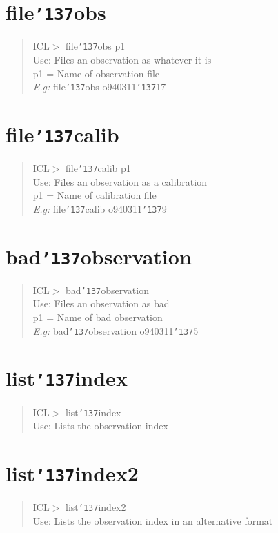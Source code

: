 \documentclass[a4paper]{book}
\renewcommand{\_}{{\tt\char'137}}
\begin{document}
\section{file\_obs}
\begin{quote}
ICL$>$ file\_obs p1 \\
Use: Files an observation as whatever it is \\
p1 = Name of observation file \\
{\em E.g:} file\_obs o940311\_17  
\end{quote}
\section{file\_calib}
\begin{quote}
ICL$>$ file\_calib p1 \\
Use: Files an observation as a calibration \\ 
p1 = Name of calibration file \\
{\em E.g:} file\_calib o940311\_9
\end{quote}
\section{bad\_observation}
\begin{quote}
ICL$>$ bad\_observation \\
Use: Files an observation as bad \\
p1 = Name of bad observation \\
{\em E.g:} bad\_observation o940311\_5
\end{quote}
\section{list\_index}
\begin{quote}
ICL$>$ list\_index \\
Use: Lists the observation index 
\end{quote}
\section{list\_index2}
\begin{quote}
ICL$>$ list\_index2 \\
Use: Lists the observation index in an alternative format
\end{quote}
\end{document}
